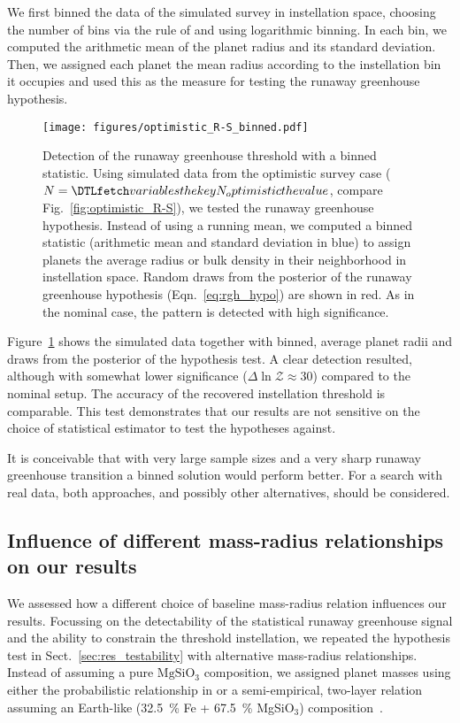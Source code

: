 \documentclass[twocolumn]{aastex631}
\begin{document}
We first binned the data of the simulated survey in instellation space, choosing the number of bins via the rule of \citet{Freedman1981} and using logarithmic binning.
In each bin, we computed the arithmetic mean of the planet radius and its standard deviation.
Then, we assigned each planet the mean radius according to the instellation bin it occupies and used this as the measure for testing the runaway greenhouse hypothesis.

\begin{figure}[ht!]
    \begin{centering}
        \texttt{[image: figures/optimistic\_R-S\_binned.pdf]}
        \caption{
            Detection of the runaway greenhouse threshold with a binned statistic.
            Using simulated data from the optimistic survey case ($N = \var{N_optimistic}$, compare Fig.~\ref{fig:optimistic_R-S}), we tested the runaway greenhouse hypothesis. Instead of using a running mean, we computed a binned statistic (arithmetic mean and standard deviation in blue) to assign planets the average radius or bulk density in their neighborhood in instellation space. Random draws from the posterior of the runaway greenhouse hypothesis (Eqn.~\ref{eq:rgh_hypo}) are shown in red.
            As in the nominal case, the pattern is detected with high significance.
        }
        \label{fig:optimistic_R-S_binned}
    \end{centering}
\end{figure}
Figure~\ref{fig:optimistic_R-S_binned} shows the simulated data together with binned, average planet radii and draws from the posterior of the hypothesis test.
A clear detection resulted, although with somewhat lower significance ($\Delta \ln \mathcal{Z} \approx 30$) compared to the nominal setup.
The accuracy of the recovered instellation threshold is comparable.
This test demonstrates that our results are not sensitive on the choice of statistical estimator to test the hypotheses against.

It is conceivable that with very large sample sizes and a very sharp runaway greenhouse transition a binned solution would perform better.
For a search with real data, both approaches, and possibly other alternatives, should be considered.

\subsection{Influence of different mass-radius relationships on our results}\label{app:MR_relation}
We assessed how a different choice of baseline mass-radius relation influences our results.
Focussing on the detectability of the statistical runaway greenhouse signal and the ability to constrain the threshold instellation, we repeated the hypothesis test in Sect.~\ref{sec:res_testability} with alternative mass-radius relationships.
Instead of assuming a pure $\mathrm{MgSiO_3}$ composition, we assigned planet masses using either the probabilistic relationship in \citet{Wolfgang2016} or a semi-empirical, two-layer relation assuming an Earth-like (\SI{32.5}{\percent} Fe + \SI{67.5}{\percent} MgSiO$_3$) composition~\citep{Zeng2016}.
\end{document}
